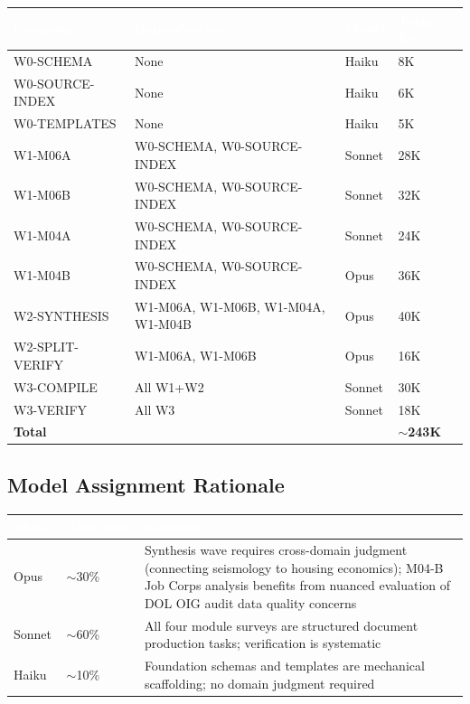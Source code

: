 \documentclass[11pt,letterpaper]{article}
\newcommand{\tableheader}[1]{\textbf{\sffamily\textcolor{white}{#1}}}
\begin{document}
\begin{center}
\begin{tabularx}{\textwidth}{L{2.8cm}L{2.8cm}C{1.5cm}C{2cm}}
\toprule
{}
\tableheader{Component} & \tableheader{Dependencies} & \tableheader{Model} & \tableheader{Token Est.} \\
\midrule
W0-SCHEMA & None & Haiku & 8K \\
W0-SOURCE-INDEX & None & Haiku & 6K \\
W0-TEMPLATES & None & Haiku & 5K \\
W1-M06A & W0-SCHEMA, W0-SOURCE-INDEX & Sonnet & 28K \\
W1-M06B & W0-SCHEMA, W0-SOURCE-INDEX & Sonnet & 32K \\
W1-M04A & W0-SCHEMA, W0-SOURCE-INDEX & Sonnet & 24K \\
W1-M04B & W0-SCHEMA, W0-SOURCE-INDEX & Opus & 36K \\
W2-SYNTHESIS & W1-M06A, W1-M06B, W1-M04A, W1-M04B & Opus & 40K \\
W2-SPLIT-VERIFY & W1-M06A, W1-M06B & Opus & 16K \\
W3-COMPILE & All W1+W2 & Sonnet & 30K \\
W3-VERIFY & All W3 & Sonnet & 18K \\
\midrule
\textbf{Total} & & & \textbf{$\sim$243K} \\
\bottomrule
\end{tabularx}
\end{center}

\subsection{Model Assignment Rationale}

\begin{center}
\begin{tabularx}{\textwidth}{C{2cm}C{2cm}X}
\toprule
{}
\tableheader{Model} & \tableheader{Allocation} & \tableheader{Rationale} \\
\midrule
Opus & $\sim$30\% & Synthesis wave requires cross-domain judgment (connecting seismology to housing economics); M04-B Job Corps analysis benefits from nuanced evaluation of DOL OIG audit data quality concerns \\
Sonnet & $\sim$60\% & All four module surveys are structured document production tasks; verification is systematic \\
Haiku & $\sim$10\% & Foundation schemas and templates are mechanical scaffolding; no domain judgment required \\
\bottomrule
\end{tabularx}
\end{center}
\end{document}
